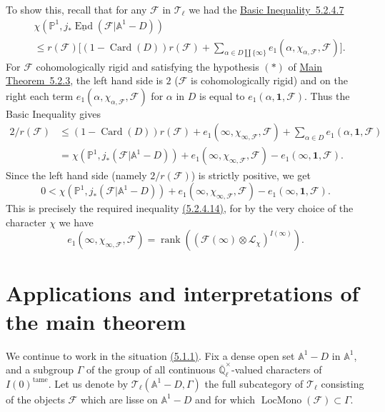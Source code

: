 To show this, recall that for any \(\mathcal{F}\) in \(\mathcal{T}_\ell\) we
had the \hyperref[ineq:5.2.4.7]{Basic Inequality~5.2.4.7}
\[
\begin{aligned}
  &\chi(\mathbb{P}^1,j_*\underline{\operatorname{End}}(\mathcal{F}\vert\mathbb{A}^1-D))\\
  &\leq
  r(\mathcal{F})\bigl[
  (1-\operatorname{Card}(D))r(\mathcal{F})
  +
  \sum_{\alpha\in D\amalg\{\infty\}}
  e_1(\alpha,\chi_{\alpha,\mathcal{F}},\mathcal{F})
  \bigr].
\end{aligned}
\]
For \(\mathcal{F}\) cohomologically rigid and satisfying the hypothesis
\((*)\) of \hyperref[thm:5.2.3]{Main Theorem~5.2.3}, the left hand side is
\(2\) (\(\mathcal{F}\) is cohomologically rigid) and on the right each term
\(e_1(\alpha,\chi_{\alpha,\mathcal{F}},\mathcal{F})\) for \(\alpha\) in \(D\)
is equal to \(e_1(\alpha,\mathbf{1},\mathcal{F})\). Thus the Basic Inequality
gives
\[
\begin{aligned}
  2/r(\mathcal{F})
  &\leq
  (1-\operatorname{Card}(D))r(\mathcal{F})
  +e_1(\infty,\chi_{\infty,\mathcal{F}},\mathcal{F})
  +\sum_{\alpha\in D}e_1(\alpha,\mathbf{1},\mathcal{F})\\
  &=
  \chi(\mathbb{P}^1,j_*(\mathcal{F}\vert\mathbb{A}^1-D))
  +e_1(\infty,\chi_{\infty,\mathcal{F}},\mathcal{F})
  -e_1(\infty,\mathbf{1},\mathcal{F}).
\end{aligned}
\]
Since the left hand side (namely \(2/r(\mathcal{F})\)) is strictly positive, we
get
\[
  0<
  \chi(\mathbb{P}^1,j_*(\mathcal{F}\vert\mathbb{A}^1-D))
  +e_1(\infty,\chi_{\infty,\mathcal{F}},\mathcal{F})
  -e_1(\infty,\mathbf{1},\mathcal{F}).
\]
This is precisely the required inequality
\hyperref[par:5.2.4.14]{(5.2.4.14)}, for by the very choice of the character
\(\chi\) we have
\[
  e_1(\infty,\chi_{\infty,\mathcal{F}},\mathcal{F})
  =
  \operatorname{rank}((\mathcal{F}(\infty)\otimes\mathcal{L}_\chi)^{I(\infty)}).
\]

\section{Applications and interpretations of the main theorem}\label{sec:5.3}

We continue to work in the situation \hyperref[par:5.1.1]{(5.1.1)}. Fix a
dense open set \(\mathbb{A}^1-D\) in \(\mathbb{A}^1\), and a subgroup
\(\Gamma\) of the group of all continuous \(\overline{\mathbb{Q}}_\ell^\times\)-valued
characters of \(I(0)^{\mathrm{tame}}\). Let us denote by
\(\mathcal{T}_\ell(\mathbb{A}^1-D,\Gamma)\) the full subcategory of
\(\mathcal{T}_\ell\) consisting of the objects \(\mathcal{F}\) which are lisse
on \(\mathbb{A}^1-D\) and for which
\(\operatorname{LocMono}(\mathcal{F})\subset\Gamma\).

